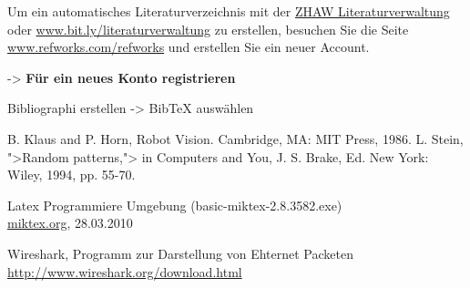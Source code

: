 
Um ein automatisches Literaturverzeichnis mit der 
\href{http://www.zhaw.ch/de/zhaw/hochschulbibliothek/dienstleistungen/literaturverwaltung.html}{ZHAW Literaturverwaltung} oder \href{www.bit.ly/literaturverwaltung}{www.bit.ly/literaturverwaltung} zu erstellen, besuchen Sie die Seite \href{www.refworks.com/refworks}{www.refworks.com/refworks} und erstellen Sie ein neuer Account.

-> \textbf{Für ein neues Konto registrieren}

Bibliographi erstellen -> BibTeX auswählen




\begin{thebibliography}{99}
\label{cha:literaturverzeichnis}








 B. Klaus and P. Horn, Robot Vision. Cambridge, MA: MIT Press, 1986.
 L. Stein, ">Random patterns,"> in Computers and You, J. S. Brake, Ed. New York: Wiley, 1994, pp. 55-70.










 Latex Programmiere Umgebung (basic-miktex-2.8.3582.exe)\\
\href{http://www.miktex.org/about}{miktex.org}, 28.03.2010

Wireshark, Programm zur Darstellung von Ehternet Packeten\\
\href{http://www.wireshark.org/download.html}{http://www.wireshark.org/download.html}



\end{thebibliography}
